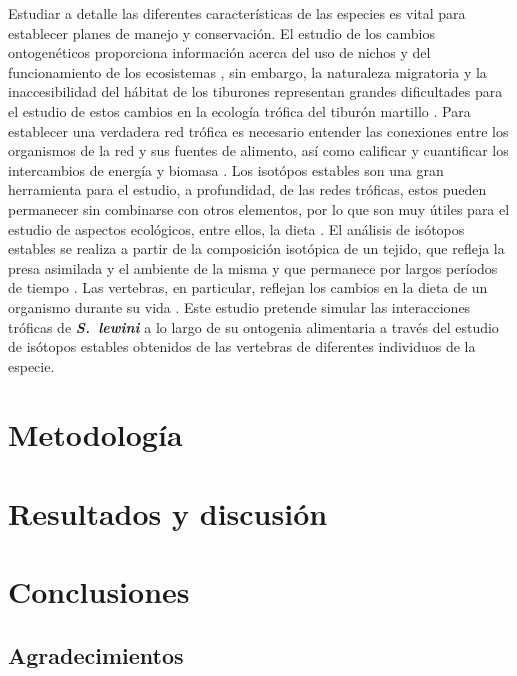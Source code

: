 \documentclass[12pt, letterpaper] {article}
\begin{document}
Estudiar  a detalle las diferentes caracter\'isticas de las especies es vital para establecer planes de manejo y conservaci\'on.  El estudio de los cambios ontogen\'eticos proporciona informaci\'on acerca del uso de nichos y del funcionamiento de los ecosistemas \cite{sak}, sin embargo, la naturaleza migratoria y la inaccesibilidad del h\'abitat de los tiburones representan grandes dificultades para el estudio de estos cambios en la ecolog\'ia tr\'ofica del tibur\'on martillo \cite{hazen}.  Para establecer una verdadera red tr\'ofica es necesario entender las conexiones entre los organismos de la red y sus fuentes de alimento, as\'i como calificar y cuantificar los intercambios de energ\'ia y biomasa \cite {kling, vander}.  Los isot\'opos estables son una gran herramienta para el estudio, a profundidad, de las redes tr\'oficas, estos pueden permanecer sin combinarse con otros elementos, por lo que son muy \'utiles para el estudio de aspectos ecol\'ogicos, entre ellos, la dieta \cite{zanden}.   El an\'alisis de is\'otopos estables se realiza a partir de la composici\'on isot\'opica de un tejido, que refleja la presa asimilada y el ambiente de la misma y que permanece por largos per\'iodos de tiempo \cite{kim}.  Las vertebras, en particular, reflejan los cambios en la dieta de un organismo durante su vida \cite{koch}.  Este estudio pretende simular las interacciones tr\'oficas de \textbf{\textit{S.\ lewini}} a lo largo de su ontogenia alimentaria a trav\'es del estudio de is\'otopos estables obtenidos de las vertebras de diferentes individuos de la especie.







\section{Metodolog\'ia}

 
\section{Resultados y discusión}


\section{Conclusiones}
  
\subsection*{Agradecimientos}




\end{document}
